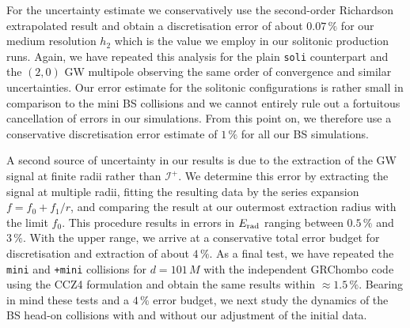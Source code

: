 %
For the uncertainty estimate we conservatively use
the second-order Richardson extrapolated result and
obtain a discretisation error of about $0.07\,\%$ for
our medium resolution $h_2$ which is the value
we employ in our solitonic production runs. Again,
we have repeated this analysis for the plain
{\tt soli} counterpart and the $(2,0)$ GW multipole
observing the same order of convergence and similar uncertainties. Our error estimate for the solitonic
configurations is rather small in comparison to the
mini BS collisions and we cannot entirely rule out a
fortuitous cancellation of errors in our simulations.
From this point on, we therefore use a conservative
discretisation error estimate of $1\,\%$ for all
our BS simulations.


A second source of uncertainty in our results is due
to the extraction of the GW signal at finite radii
rather than $\mathcal{I}^+$. We determine this error
by extracting the signal at multiple radii, fitting
the resulting data by the series expansion
$f=f_0+f_1/r$, and comparing the result at our outermost
extraction radius with the limit $f_0$. This procedure
results in errors in $E_{\rm rad}$ ranging between $0.5\,\%$
and $3\,\%$. With the upper range, we arrive at
a conservative total error budget for discretisation and
extraction of about $4\,\%$.
As a final test, we have repeated the {\tt mini} and
{\tt +mini} collisions for $d=101\,M$
with the independent {\sc GRChombo}
code \cite{Clough:2015sqa,Radia:2021} using the CCZ4 formulation \cite{Alic:2011gg} and obtain the same results within $\approx 1.5\,\%$.
Bearing in mind these tests and a $4\,\%$ error budget,
we next study the dynamics of the BS head-on collisions
with and without our adjustment of the initial data.


